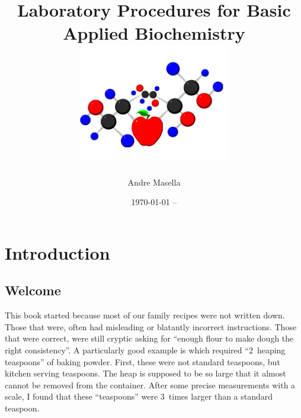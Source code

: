\usepackage{fancyhdr}
\usepackage{textcomp}
\usepackage{graphicx}
\usepackage{ifthen}
\usepackage{multicol}
\usepackage{makeidx}
\usepackage{mdwlist}
\usepackage{xfrac}
\usepackage[utf8]{inputenc}
\usepackage[chapter]{tocbibind}
\usepackage[sf,medium,compact]{titlesec}
\setcounter{secnumdepth}{0}
\usepackage[pdftitle={Laboratory Procedures for Basic Applied Biochemistry},pdfauthor={Andre Masella},plainpages=false,pdfpagelabels,pdfborder=0 0 0]{hyperref}

\makeindex




\pagestyle{fancy}

\frontmatter
\thispagestyle{plain}

\title{Laboratory Procedures for Basic Applied Biochemistry \\
\includegraphics[width=0.5\textwidth]{CoverLogo}}
\author{Andre Masella}
\date{\today{} -- }
\maketitle

\tableofcontents

\chapter{Introduction}

\section{Welcome}
This book started because most of our family recipes were not written down. Those that were, often had misleading or blatantly incorrect instructions. Those that were correct, were still cryptic asking for ``enough flour to make dough the right consistency''. A particularly good example is  which required ``2~heaping teaspoons'' of baking powder. First, these were not standard teaspoons, but kitchen serving teaspoons. The heap is supposed to be so large that it almost cannot be removed from the container. After some precise measurements with a scale, I found that these ``teaspoons'' were 3~times larger than a standard teaspoon.


